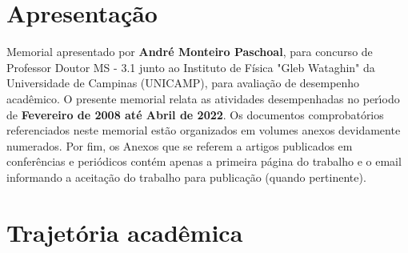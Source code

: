 \documentclass[a4paper,oneside,10pt]{article}
\newcounter{document}%
\begin{document}
\tableofcontents


\newpage
\section*{Apresenta\c{c}\~{a}o}
\vspace{0.3cm}

\begin{onehalfspace}

Memorial apresentado por \textbf{André Monteiro Paschoal}, para concurso de Professor Doutor MS - 3.1 junto ao Instituto de Física "Gleb Wataghin" da Universidade de Campinas (UNICAMP), para avalia\c{c}\~{a}o de desempenho acad\^{e}mico.
O presente memorial relata as atividades desempenhadas no per\'{\i}odo de \textbf{Fevereiro de 2008 até Abril de 2022}. Os documentos comprobat\'{o}rios referenciados neste memorial est\~{a}o organizados em volumes anexos devidamente numerados. 
Por fim, os Anexos que se referem a artigos publicados em confer\^{e}ncias e peri\'{o}dicos cont\'{e}m apenas a primeira p\'{a}gina do trabalho e o email informando a aceita\c{c}\~{a}o do trabalho para publica\c{c}\~{a}o (quando pertinente).

\end{onehalfspace}


\newpage
\section{Trajet\'{o}ria acad\^{e}mica}
\vspace{0.3cm}
\end{document}
